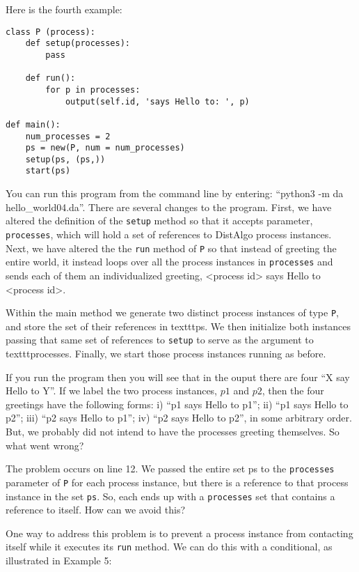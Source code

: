 \documentclass[11pt]{article}
\begin{document}
Here is the fourth example:

\begin{lstlisting}[caption={hello\_world04.da - Multiple Processes Referring to Each Other}, label={lst:hw04}]
class P (process):
    def setup(processes):
        pass

    def run():
        for p in processes:
            output(self.id, 'says Hello to: ', p)

def main():
    num_processes = 2
    ps = new(P, num = num_processes)
    setup(ps, (ps,))
    start(ps)  
\end{lstlisting}

\noindent You can run this program from the command line by entering:
``python3 -m da hello\_world04.da''. There are several changes to the program.
First, we have altered the definition of the \texttt{setup} method so that it
accepts parameter, \texttt{processes}, which will hold a set of references to
DistAlgo process instances. Next, we have altered the the \texttt{run} method
of \texttt{P} so that instead of greeting the entire world, it instead loops
over all the process instances in \texttt{processes} and sends each of them
an individualized greeting, <process id> says Hello to <process id>. 

Within the main method we generate two distinct process instances of type
\texttt{P}, and store the set of their references in texttt{ps}. We then
initialize both instances passing that same set of references to \texttt{setup}
to serve as the argument to texttt{processes}. Finally, we start those process
instances running as before.

If you run the program then you will see that in the ouput there are four
``X say Hello to Y''. If we label the two process instances, $p1$ and $p2$,
then the four greetings have the following forms: i) ``p1 says Hello to p1'';
ii) ``p1 says Hello to p2''; iii) ``p2 says Hello to p1'';
iv) ``p2 says Hello to p2'', in some arbitrary order. But, we probably did not
intend to have the processes greeting themselves. So what went wrong?

The problem occurs on line 12. We passed the entire set ps to the
\texttt{processes} parameter of \texttt{P} for each process instance, but there
is a reference to that process instance in the set \texttt{ps}. So, each ends
up with a \texttt{processes} set that contains a reference to itself. How can
we avoid this?

One way to address this problem is to prevent a process instance from
contacting itself while it executes its \texttt{run} method. We can do this
with a conditional, as illustrated in Example 5:
\end{document}
